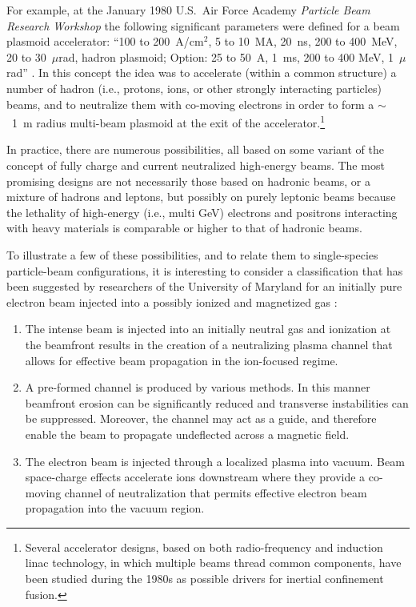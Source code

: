 \documentclass [12pt,a4paper,     ]{report} %
\begin{document}
   For example, at the January 1980 U.S.\ Air Force Academy \emph{Particle Beam Research Workshop} the following significant parameters were defined for a beam plasmoid accelerator: ``100 to 200~A/cm$^2$, 5 to 10~MA, 20~ns, 200 to 400~MeV, 20 to 30~$\mu$rad, hadron plasmoid; Option:  25 to 50~A, 1~ms, 200 to 400 MeV, 1~$\mu$rad'' \cite[p.55]{GUENT1980-}.  In this concept the idea was to accelerate (within a common structure) a number of hadron (i.e., protons, ions, or other strongly interacting particles) beams, and to neutralize them with co-moving electrons in order to form a $\sim$~1~m radius multi-beam plasmoid at the exit of the accelerator.\footnote{Several accelerator designs, based on both radio-frequency and induction linac technology, in which multiple beams thread common components, have been studied during the 1980s as possible drivers for inertial confinement fusion.}

In practice, there are numerous possibilities, all based on some variant of the concept of fully charge and current neutralized high-energy beams.  The most promising designs are not necessarily those based on hadronic beams, or a mixture of hadrons and leptons, but possibly on purely leptonic beams because the lethality of high-energy (i.e., multi GeV) electrons and positrons interacting with heavy materials is comparable or higher to that of hadronic beams.  

To illustrate a few of these possibilities, and to relate them to single-species particle-beam configurations, it is interesting to consider a classification that has been suggested by researchers of the University of Maryland  for an initially pure electron beam injected into a possibly ionized and magnetized gas  \cite{DESTL1988-}:
\begin{enumerate}

\item The intense beam is injected into an initially neutral gas and ionization at the beamfront results in the creation of a neutralizing plasma channel that allows for effective beam propagation in the ion-focused regime.

\item A pre-formed channel is produced by various methods.  In this manner beamfront erosion can be significantly reduced and transverse instabilities can be suppressed.  Moreover, the channel may act as a guide, and therefore enable the beam to propagate undeflected across a magnetic field.

\item The electron beam is injected through a localized plasma into vacuum. Beam space-charge effects accelerate ions downstream where they provide a co-moving channel of neutralization that permits effective electron beam propagation into the vacuum region.

\end{enumerate}
\end{document}
